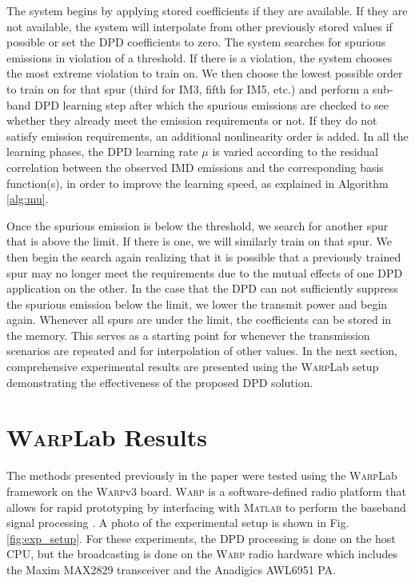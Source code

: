 The system begins by applying stored coefficients if they are available. 
If they are not available, the system will interpolate from other previously stored values if possible or set the DPD coefficients to zero. 
The system searches for spurious emissions in violation of a threshold. 
If there is a violation, the system chooses the most extreme violation to train on. 
We then choose the lowest possible order to train on for that spur (third for IM3, fifth for IM5, etc.) and perform a sub-band DPD learning step after which the spurious emissions are checked to see whether they already meet the emission requirements or not. 
If they do not satisfy emission requirements, an additional nonlinearity order is added. 
In all the learning phases, the DPD learning rate $\mu$ is varied according to the residual correlation between the observed IMD emissions and the corresponding basis function(s), in order to improve the learning speed, as explained in Algorithm \ref{alg:mu}. 

Once the spurious emission is below the threshold, we search for another spur that is above the limit. If there is one, we will similarly train on that spur. We then begin the search again realizing that it is possible that a previously trained spur may no longer meet the requirements due to the mutual effects of one DPD application on the other. In the case that the DPD can not sufficiently suppress the spurious emission below the limit, we lower the transmit power and begin again. Whenever all spurs are under the limit, the coefficients can be stored in the memory.
This serves as a starting point for whenever the transmission scenarios are repeated and for interpolation of other values. 
In the next section, comprehensive experimental results are presented using the \textsc{Warp}Lab setup demonstrating the effectiveness of the proposed DPD solution.

\section{\textsc{Warp}Lab Results}
\label{sec:WARPLabResults}
The methods presented previously in the paper were tested using the \textsc{Warp}Lab framework on the \textsc{Warp}v3 board. 
\textsc{Warp} is a software-defined radio platform that allows for rapid prototyping by interfacing with \textsc{Matlab} to perform the baseband signal processing  \cite{warpProject}. 
A photo of the experimental setup is shown in Fig. \ref{fig:exp_setup}. 
For these experiments, the DPD processing is done on the host CPU, but the broadcasting is done on the \textsc{Warp} radio hardware which includes the Maxim MAX2829 transceiver and the Anadigics AWL6951 PA.


